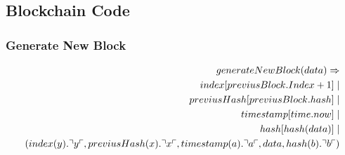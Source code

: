 \subsection{Blockchain Code}

\subsubsection{Generate New Block}

\begin{align*}
generateNewBlock(data)\Rightarrow \\ index[previusBlock.Index + 1]\mid\\
previusHash[previusBlock.hash] \mid \\
timestamp[time.now] \mid \\
hash[hash(data)] \mid \\
(index(y).\urcorner y \ulcorner, previusHash(x).\urcorner x \ulcorner, timestamp(a).\urcorner a \ulcorner, data, hash(b).\urcorner b \ulcorner)
\end{align*}
